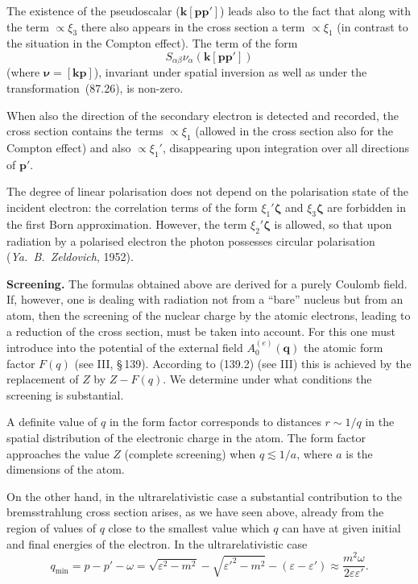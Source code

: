 The existence of the pseudoscalar ($\mathbf{k}[\mathbf{pp}']$) leads also to the fact that along with the term $\propto \xi_3$ there also appears in the cross section a term $\propto \xi_1$ (in contrast to the situation in the Compton effect). The term of the form
\[
S_{\alpha\beta}\nu_\alpha(\mathbf{k}[\mathbf{pp}'])
\]
(where $\boldsymbol{\nu} = [\mathbf{kp}]$), invariant under spatial inversion as well as under the transformation~(87.26), is non-zero.

When also the direction of the secondary electron is detected and recorded, the cross section contains the terms $\propto \xi_1$ (allowed in the cross section also for the Compton effect) and also $\propto \xi_1'$, disappearing upon integration over all directions of $\mathbf{p}'$.


The degree of linear polarisation does not depend on the polarisation state of the incident electron: the correlation terms of the form $\xi_1'\boldsymbol{\zeta}$ and $\xi_3\boldsymbol{\zeta}$ are forbidden in the first Born approximation. However, the term $\xi_2'\boldsymbol{\zeta}$ is allowed, so that upon radiation by a polarised electron the photon possesses circular polarisation (\emph{Ya.~B.~Zeldovich}, 1952).

\textbf{Screening.} The formulas obtained above are derived for a purely Coulomb field. If, however, one is dealing with radiation not from a ``bare'' nucleus but from an atom, then the screening of the nuclear charge by the atomic electrons, leading to a reduction of the cross section, must be taken into account. For this one must introduce into the potential of the external field $A_0^{(e)}(\mathbf{q})$ the atomic form factor $F(q)$ (see III, \S\,139). According to (139.2) (see III) this is achieved by the replacement of $Z$ by $Z - F(q)$. We determine under what conditions the screening is substantial.

A definite value of $q$ in the form factor corresponds to distances $r \sim 1/q$ in the spatial distribution of the electronic charge in the atom. The form factor approaches the value $Z$ (complete screening) when $q \lesssim 1/a$, where $a$ is the dimensions of the atom.

On the other hand, in the ultrarelativistic case a substantial contribution to the bremsstrahlung cross section arises, as we have seen above, already from the region of values of $q$ close to the smallest value which $q$ can have at given initial and final energies of the electron. In the ultrarelativistic case
\begin{equation}
q_\text{min} = p - p' - \omega = \sqrt{\varepsilon^2 - m^2} - \sqrt{\varepsilon'^2 - m^2} - (\varepsilon - \varepsilon') \approx \frac{m^2\omega}{2\varepsilon\varepsilon'}.
\label{eq:93.20}
\end{equation}

